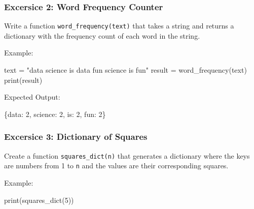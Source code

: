 \documentclass[
  letterpaper,
  DIV=11,
  numbers=noendperiod]{scrreprt}
\newenvironment{Shaded}{\begin{snugshade}}{\end{snugshade}}
\newcommand{\BuiltInTok}[1]{\textcolor[rgb]{0.00,0.23,0.31}{#1}}
\newcommand{\DecValTok}[1]{\textcolor[rgb]{0.68,0.00,0.00}{#1}}
\newcommand{\NormalTok}[1]{\textcolor[rgb]{0.00,0.23,0.31}{#1}}
\newcommand{\OperatorTok}[1]{\textcolor[rgb]{0.37,0.37,0.37}{#1}}
\newcommand{\StringTok}[1]{\textcolor[rgb]{0.13,0.47,0.30}{#1}}
\begin{document}
\hypertarget{excersice-2-word-frequency-counter}{%
\subsubsection{Excersice 2: Word Frequency
Counter}\label{excersice-2-word-frequency-counter}}

Write a function \texttt{word\_frequency(text)} that takes a string and
returns a dictionary with the frequency count of each word in the
string.

Example:

\begin{Shaded}
\begin{Highlighting}[]
\NormalTok{text }\OperatorTok{=} \StringTok{"data science is data fun science is fun"}
\NormalTok{result }\OperatorTok{=}\NormalTok{ word\_frequency(text)}
\BuiltInTok{print}\NormalTok{(result)}
\end{Highlighting}
\end{Shaded}

Expected Output:

\begin{Shaded}
\begin{Highlighting}[]
\NormalTok{\{}\StringTok{\textquotesingle{}data\textquotesingle{}}\NormalTok{: }\DecValTok{2}\NormalTok{, }\StringTok{\textquotesingle{}science\textquotesingle{}}\NormalTok{: }\DecValTok{2}\NormalTok{, }\StringTok{\textquotesingle{}is\textquotesingle{}}\NormalTok{: }\DecValTok{2}\NormalTok{, }\StringTok{\textquotesingle{}fun\textquotesingle{}}\NormalTok{: }\DecValTok{2}\NormalTok{\}}
\end{Highlighting}
\end{Shaded}

\hypertarget{excersice-3-dictionary-of-squares}{%
\subsubsection{Excersice 3: Dictionary of
Squares}\label{excersice-3-dictionary-of-squares}}

Create a function \texttt{squares\_dict(n)} that generates a dictionary
where the keys are numbers from 1 to \texttt{n} and the values are their
corresponding squares.

Example:

\begin{Shaded}
\begin{Highlighting}[]
\BuiltInTok{print}\NormalTok{(squares\_dict(}\DecValTok{5}\NormalTok{))}
\end{Highlighting}
\end{Shaded}
\end{document}
